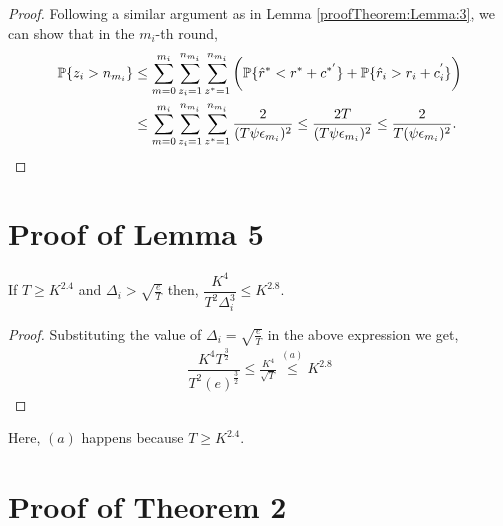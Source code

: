 \begin{proof}
Following a similar argument as in Lemma \ref{proofTheorem:Lemma:3}, we can show that in the $m_i$-th round,
\begin{align*}
\mathbb{P}\lbrace z_i > n_{m_i} \rbrace &\leq \sum_{m=0}^{m_i}\sum_{z_i =1}^{n_{m_i}}\sum_{z^* =1}^{n_{m_i}}\bigg(\mathbb{P}\lbrace \hat{r}^* < r^* + c^{*'}\rbrace + \mathbb{P}\lbrace \hat{r}_i > r_i + c_i^{'}\rbrace\bigg) \\
&\leq \sum_{m=0}^{m_i}\sum_{z_i =1}^{n_{m_i}}\sum_{z^* =1}^{n_{m_i}} \dfrac{2}{(T\psi \epsilon_{m_i})^2} \leq \dfrac{2 T}{(T\psi \epsilon_{m_i})^2}\leq  \dfrac{2}{T(\psi \epsilon_{m_i})^2}.
\end{align*}
\end{proof}

\section{Proof of Lemma 5}
\label{App:Lemma5}
\begin{lemma}
\label{proofTheorem:Lemma:5}
If $T\geq K^{2.4}$ and $	\Delta_{i} > \sqrt{\frac{e}{T}}$ then, $\dfrac{K^4}{T^2 \Delta_i^3} \leq K^{2.8}$.
\end{lemma}

\begin{proof}
Substituting the value of $\Delta_{i}=\sqrt{\frac{e}{T}}$ in the above expression we get,
\begin{align*}
\dfrac{K^4 T^{\frac{3}{2}}}{T^2 (e)^{\frac{3}{2}}} \leq \frac{K^{4}}{\sqrt{T}} \overset{(a)}{\leq}  K^{2.8}
\end{align*}  
\end{proof}

Here, $(a)$ happens because $T\geq K^{2.4}$.


\section{Proof of Theorem 2}
\label{sec:proofTheorem2}
